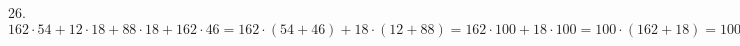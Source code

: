 26. $162\cdot54+12\cdot18 + 88\cdot18+ 162\cdot46=162\cdot(54+46)+18\cdot(12+88)=162\cdot100+18\cdot100=100\cdot(162+18)=100\cdot180=18000.$\\
